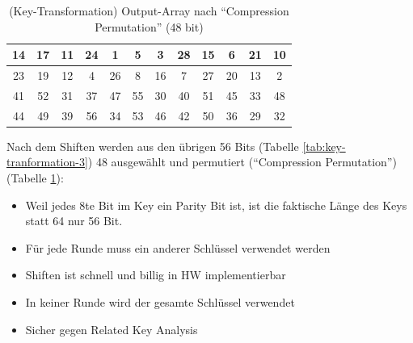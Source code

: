 \begin{table}[H]
    \centering
    \begin{tabular}{|*{12}{c|}}
        \hline
        \cellcolor{orange-1}14 & \cellcolor{yellow-1}17 & \cellcolor{orange-1}11 & \cellcolor{yellow-1}24 & 
        \cellcolor{red-1}1 & \cellcolor{red-1}5 & \cellcolor{red-1}3 & \cellcolor{green-1}28 &
        \cellcolor{orange-1}15 & \cellcolor{red-1}6 & \cellcolor{yellow-1}21 & \cellcolor{orange-1}10 \\
        \hline 
        
        \cellcolor{yellow-1}23 & \cellcolor{yellow-1}19 & \cellcolor{orange-1}12 & \cellcolor{red-1}4 & 
        \cellcolor{green-1}26 & \cellcolor{red-1}8 & \cellcolor{orange-1}16 & \cellcolor{red-1}7 & 
        \cellcolor{green-1}27 & \cellcolor{yellow-1}20 & \cellcolor{orange-1}13 & \cellcolor{red-1}2 \\
        \hline

        
        \cellcolor{blue-1}41 & \cellcolor{purple-1}52 & \cellcolor{green-1}31 & \cellcolor{cyan-1}37 & 
        \cellcolor{blue-1}47 & \cellcolor{purple-1}55 & \cellcolor{green-1}30 & \cellcolor{cyan-1}40 & 
        \cellcolor{purple-1}51 & \cellcolor{blue-1}45 & \cellcolor{cyan-1}33 & \cellcolor{blue-1}48 \\
        \hline

        \cellcolor{blue-1}44 & \cellcolor{purple-1}49 & \cellcolor{cyan-1}39 & \cellcolor{purple-1}56 &
        \cellcolor{cyan-1}34 & \cellcolor{purple-1}53 & \cellcolor{blue-1}46 & \cellcolor{blue-1}42 &
        \cellcolor{purple-1}50 & \cellcolor{cyan-1}36 & \cellcolor{green-1}29 & \cellcolor{green-1}32 \\
        \hline
    \end{tabular}
    \caption{(Key-Transformation) Output-Array nach ``Compression Permutation'' (48 bit)}
    \label{tab:key-tranformation-4}
\end{table}

Nach dem Shiften werden aus den übrigen 56 Bits (Tabelle \ref{tab:key-tranformation-3}) 48 ausgewählt und permutiert 
(``Compression Permutation'') (Tabelle \ref{tab:key-tranformation-4}):

\begin{itemize}
    \item Weil jedes 8te Bit im Key ein Parity Bit ist, ist die faktische Länge des Keys statt 64 nur 56 Bit. 
    \item Für jede Runde muss ein anderer Schlüssel verwendet werden 
    \item Shiften ist schnell und billig in HW implementierbar 
    \item In keiner Runde wird der gesamte Schlüssel verwendet 
    \item Sicher gegen Related Key Analysis
\end{itemize}

